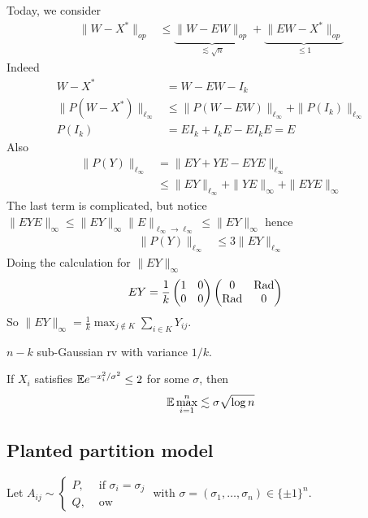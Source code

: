 Today, we consider
\begin{align}
  \|W - X^*\|_{op}
  &\leq \underbrace{\|W - E W\|_{op}}_{\lesssim \sqrt{n}} + \underbrace{\|E W - X^*\|_{op}}_{\leq 1}
\end{align}
Indeed
\begin{align}
  W - X^* &= W - E W - I_k \\
  \|P(W - X^*)\|_{\ell_\infty} &\leq \|P(W - EW)\|_{\ell_\infty} + \|P(I_k)\|_{\ell_\infty} \\
  P(I_k) &= E I_k + I_k E - E I_k E = E
\end{align}
Also
\begin{align}
  \|P(Y)\|_{\ell_\infty}
  &= \|E Y + Y E - E Y E \|_{\ell_\infty} \\
  &\leq \|E Y\|_{\ell_\infty} + \|Y E \|_{\infty} + \|E Y E\|_{\infty}
\end{align}
The last term is complicated, but notice
$\|EYE\|_\infty \leq \|E Y\|_\infty \|E\|_{\ell_\infty \to \ell_\infty} \leq \|E Y\|_\infty$
hence
\begin{align}
  \|P(Y)\|_{\ell_\infty}
  &\leq 3 \|E Y\|_{\ell_\infty}
\end{align}
Doing the calculation for $\|E Y\|_\infty$
\begin{align}
  E Y &= \frac{1}{k} \begin{pmatrix}
    1 & 0 \\ 0 & 0
  \end{pmatrix} \begin{pmatrix}
    0 & \text{Rad} \\ \text{Rad} & 0
  \end{pmatrix}
\end{align}
So $\|E Y\|_\infty = \frac{1}{k} \max_{j \not\in K} \sum_{i \in K} Y_{ij}$.

$n-k$ sub-Gaussian rv with variance $1/k$.

\begin{lemma}
  If $X_i$ satisfies $\mathbb{E} e^{-x_i^2 / \sigma^2} \leq 2$ for
  some $\sigma$, then
  \begin{align}
    \mathbb{E} \max_{i=1}^n \lesssim \sigma \sqrt{\log n}
  \end{align}
\end{lemma}

\subsection{Planted partition model}

Let $A_{ij} \sim \begin{cases}
  P, &\text{ if }\sigma_i = \sigma_j\\
  Q, &\text{ ow }
\end{cases}$
with $\sigma = (\sigma_1, \ldots, \sigma_n) \in \{\pm 1\}^n$.

